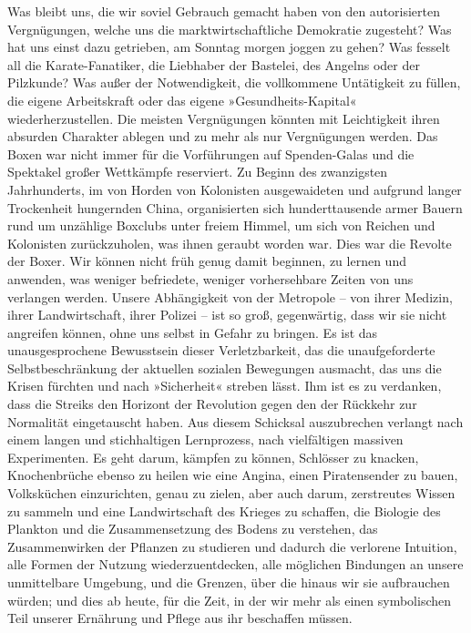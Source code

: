 Was bleibt uns, die wir soviel Gebrauch gemacht haben von den
autorisierten Vergnügungen, welche uns die marktwirtschaftliche
Demokratie zugesteht? Was hat uns einst dazu getrieben, am Sonntag
morgen joggen zu gehen? Was fesselt all die Karate-Fanatiker, die
Liebhaber der Bastelei, des Angelns oder der Pilzkunde? Was außer
der Notwendigkeit, die vollkommene Untätigkeit zu füllen, die
eigene Arbeitskraft oder das eigene »Ge\-sund\-heits-Ka\-pi\-tal«
wiederherzustellen. Die meisten Vergnügungen könnten mit
Leichtigkeit ihren absurden Charakter ablegen und zu mehr als nur
Vergnügungen werden. Das Boxen war nicht immer für die Vorführungen
auf Spenden-Galas und die Spektakel großer Wettkämpfe reserviert.
Zu Beginn des zwanzigsten Jahrhunderts, im von Horden von
Kolonisten ausgewaideten und aufgrund langer Trockenheit hungernden
China, organisierten sich hunderttausende armer Bauern rund um
unzählige Boxclubs unter freiem Himmel, um sich von Reichen und
Kolonisten zurückzuholen, was ihnen geraubt worden war. Dies war
die Revolte der Boxer. Wir können nicht früh genug damit beginnen,
zu lernen und anwenden, was weniger befriedete, weniger
vorhersehbare Zeiten von uns verlangen werden. Unsere Abhängigkeit
von der Metropole – von ihrer Medizin, ihrer Landwirtschaft, ihrer
Polizei – ist so groß, gegenwärtig, dass wir sie nicht angreifen
können, ohne uns selbst in Gefahr zu bringen. Es ist das
unausgesprochene Bewusstsein dieser Verletzbarkeit, das die
unaufgeforderte Selbstbeschränkung der aktuellen sozialen
Bewegungen ausmacht, das uns die Krisen fürchten und nach
»Sicherheit« streben lässt. Ihm ist es zu verdanken, dass die
Streiks den Horizont der Revolution gegen den der Rückkehr zur
Normalität eingetauscht haben. Aus diesem Schicksal auszubrechen
verlangt nach einem langen und stichhaltigen Lernprozess, nach
vielfältigen massiven Experimenten. Es geht darum, kämpfen zu
können, Schlösser zu knacken, Knochenbrüche ebenso zu heilen wie
eine Angina, einen Piratensender zu bauen, Volksküchen
einzurichten, genau zu zielen, aber auch darum, zerstreutes Wissen
zu sammeln und eine Landwirtschaft des Krieges zu schaffen, die
Biologie des Plankton und die Zusammensetzung des Bodens zu
verstehen, das Zusammenwirken der Pflanzen zu studieren und dadurch
die verlorene Intuition, alle Formen der Nutzung wiederzuentdecken,
alle möglichen Bindungen an unsere unmittelbare Umgebung, und die
Grenzen, über die hinaus wir sie aufbrauchen würden; und dies ab
heute, für die Zeit, in der wir mehr als einen symbolischen Teil
unserer Ernährung und Pflege aus ihr beschaffen müssen.

